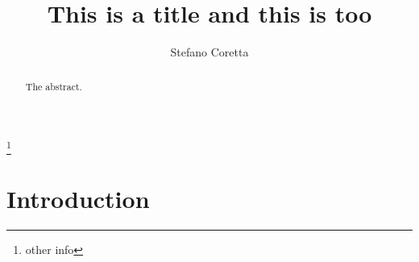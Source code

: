\documentclass[preprint]{JASAnew}
\begin{document}

\title[A subtitle goes on another line]{This is a title and this is too}



\author{Stefano Coretta}
\thanks{other info}





\begin{abstract}
The abstract.
\end{abstract}


\maketitle




\section{Introduction}\label{introduction}
\end{document}

